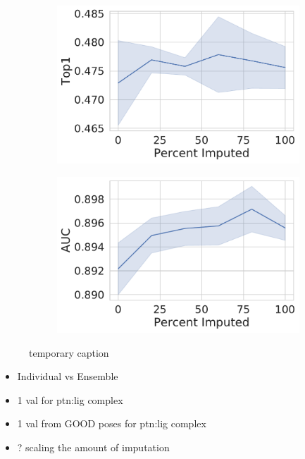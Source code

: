 \documentclass[journal=jmcmar,manuscript=article]{achemso}
\begin{document}
\begin{figure}[tbph]
    \begin{subfigure}[t]{0.48\textwidth}
        \centering
        \includegraphics[width=\linewidth]{figures/MedGOEns_addingImpTop1.pdf}
    \end{subfigure}
    \hfill
    \begin{subfigure}[t]{0.48\textwidth}
        \centering
        \includegraphics[width=\linewidth]{figures/MedGOEns_addingImpAUC.pdf}
    \end{subfigure}
    \caption{temporary caption}
    \label{fig:medGOEnsAdding}
\end{figure}


\begin{itemize}
    \item Individual vs Ensemble
    \item 1 val for ptn:lig complex
    \item 1 val from GOOD poses for ptn:lig complex
    \item ? scaling the amount of imputation
\end{itemize}
\end{document}
